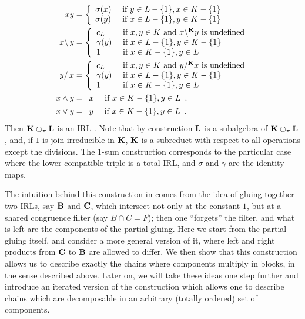 \documentclass{amsart}
\theoremstyle{definition}
\numberwithin{equation}{section}
\newcommand{\alg}[1]{{\textbf{\upshape #1}}}  %
\newcommand{\back}{\backslash}
\begin{document}
\begin{align*}
x y &=\left\{\begin{array}{ll}
\sigma(x) & \mbox{ if } y \in L - \{1\}, x \in K - \{1\}\\
\sigma(y) & \mbox{ if } x \in L - \{1\}, y \in K - \{1\}\end{array}\right.\\
x\back\, y &=\left\{\begin{array}{ll} 
c_{L} & \mbox{ if } x, y \in  K \mbox { and $x \back^{\alg K} y$ is undefined}\\ 
\gamma(y) & \mbox{ if } x \in L - \{1\}, y \in K - \{1\} \\
1 & \mbox{ if } x \in K - \{1\}, y \in L\\ \end{array}\right.\\
y/\, x &=\left\{\begin{array}{ll} 
c_{L} & \mbox{ if } x, y \in  K \mbox{ and $y/^{\alg K} x$ is undefined}\\
\gamma(y) & \mbox{ if } x \in L - \{1\}, y \in K - \{1\} \\
1 & \mbox{ if } x \in K - \{1\}, y \in L\\\end{array}\right.\\
x \land y &=\begin{array}{ll}
x & \mbox{ if } x \in K - \{1\}, y \in L\end{array}.\\
x \lor y &=\begin{array}{ll}
y & \mbox{ if } x \in K -\{1\}, y \in L\end{array}.
\end{align*}
Then 
$\alg K \oplus_{\pi}  \alg L$ is an IRL \cite[Proposition 2.9]{GalatosUgolini}. Note that by construction $\alg L$ is a subalgebra of $\alg K \oplus_{\pi}  \alg L$, and, if $1$ is join irreducible in $\alg K$, $\alg K$ is a subreduct with respect to all operations except the divisions.  
The 1-sum construction corresponds to the particular case where the lower compatible triple is a total IRL, and $\sigma$ and $\gamma$ are the identity maps.

The intuition behind this construction in \cite{GalatosUgolini} comes from the idea of gluing together two IRLs, say $\alg B$ and $\alg C$, which intersect not only at the constant $1$, but at a shared congruence filter (say $B \cap C = F$); then one ``forgets'' the filter, and what is left are the components of the partial gluing. Here we start from the partial gluing itself, and consider a more general version of it, where left and right products from $\alg C$ to $\alg B$ are allowed to differ. We then show that this construction allows us to describe exactly the chains where components multiply in blocks, in the sense described above. Later on, we will take these ideas one step further and introduce an iterated version of the construction which allows one to describe chains which are decomposable in an arbitrary (totally ordered) set of components.
\end{document}
